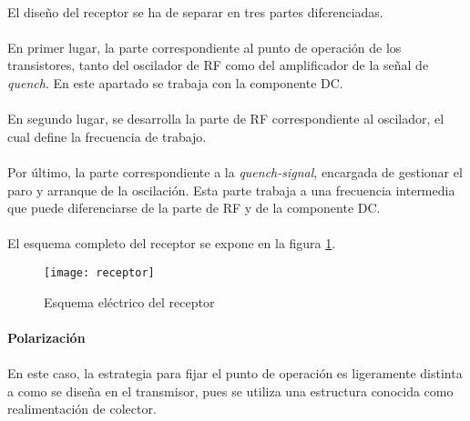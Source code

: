 \paragraph{}
El diseño del receptor se ha de separar en tres partes diferenciadas.
\paragraph{}
En primer lugar, la parte correspondiente al punto de operación de los transistores, tanto del oscilador de RF como del amplificador de la señal de \textit{quench}. En este apartado se trabaja con la componente DC.
\paragraph{}
En segundo lugar, se desarrolla la parte de RF correspondiente al oscilador, el cual define la frecuencia de trabajo. 
\paragraph{}
Por último, la parte correspondiente a la \textit{quench-signal}, encargada de gestionar el paro y arranque de la oscilación. Esta parte trabaja a una frecuencia intermedia que puede diferenciarse de la parte de RF y de la componente DC.

\paragraph{}
El esquema completo del receptor se expone en la figura \ref{fig:rx}.
\begin{figure}[h]
    \centering
    \texttt{[image: receptor]}
    \caption{Esquema el\'ectrico del receptor}
    \label{fig:rx}
\end{figure}

\paragraph{Polarización} %
\paragraph{}
En este caso, la estrategia para fijar el punto de operación es ligeramente distinta a como se diseña en el transmisor, pues se utiliza una estructura conocida como realimentaci\'on de colector. 
